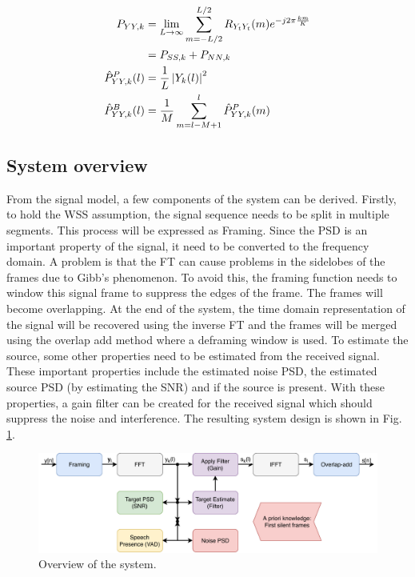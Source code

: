 \begin{align}
  P_{YY,k} &= \lim_{L \to \infty} \sum_{m=-L/2}^{L/2} R_{Y_{t}Y_{t}}(m) e^{-j2\pi \frac{km}{K}}
  \label{eq:pyyk1} \\
  &= P_{SS,k} + P_{NN,k}
  \label{eq:pyyk2} \\
  \hat P_{YY,k}^{P}(l) &= \frac{1}{L}\abs{Y_{k}(l)}^{2}
  \label{eq:pyyest} \\
  \hat P_{YY,k}^{B}(l) &= \frac{1}{M}\sum_{m=l-M+1}^{l} \hat P_{YY,k}^{P}(m)
  \label{eq:pyyBest}
\end{align}

\subsection{System overview}
From the signal model, a few components of the system can be derived. Firstly, to hold the WSS assumption, the signal sequence needs to be split in multiple segments. This process will be expressed as Framing.
Since the PSD is an important property of the signal, it need to be converted to the frequency domain. A problem is that the FT can cause problems in the sidelobes of the frames due to Gibb's phenomenon. To avoid this, the framing function needs to window this signal frame to suppress the edges of the frame. The frames will become overlapping.
At the end of the system, the time domain representation of the signal will be recovered using the inverse FT and the frames will be merged using the overlap add method where a deframing window is used.
To estimate the source, some other properties need to be estimated from the received signal. These important properties include the estimated noise PSD, the estimated source PSD (by estimating the SNR) and if the source is present. With these properties, a gain filter can be created for the received signal which should suppress the noise and interference.
The resulting system design is shown in Fig. \ref{fig:system}.

\begin{figure}[h]
  \includegraphics[width=\textwidth]{images/system.pdf}
  \caption{Overview of the system.}
  \label{fig:system}
\end{figure}

